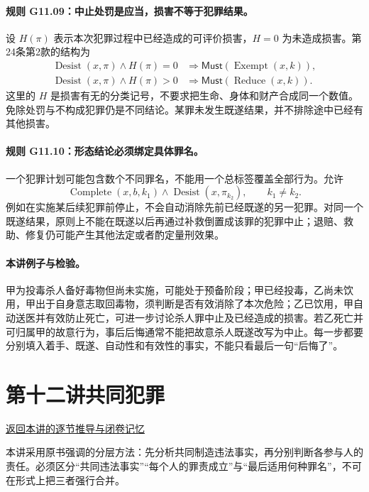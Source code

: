 \paragraph{规则 G11.09：中止处罚是应当，损害不等于犯罪结果。}
设 $H(\pi)$ 表示本次犯罪过程中已经造成的可评价损害，$H=0$ 为未造成损害。第24条第2款的结构为
\[
\begin{aligned}
\operatorname{Desist}(x,\pi)\land H(\pi)=0
&\Longrightarrow\mathsf{Must}(\operatorname{Exempt}(x,k)),\\
\operatorname{Desist}(x,\pi)\land H(\pi)>0
&\Longrightarrow\mathsf{Must}(\operatorname{Reduce}(x,k)).
\end{aligned}
\]
这里的 $H$ 是损害有无的分类记号，不要求把生命、身体和财产合成同一个数值。免除处罚与不构成犯罪仍是不同结论。某罪未发生既遂结果，并不排除途中已经有其他损害。

\paragraph{规则 G11.10：形态结论必须绑定具体罪名。}
一个犯罪计划可能包含数个不同罪名，不能用一个总标签覆盖全部行为。允许
\[
\operatorname{Complete}(x,b,k_1)\land\operatorname{Desist}(x,\pi_{k_2}),
\qquad k_1\ne k_2.
\]
例如在实施某后续犯罪前停止，不会自动消除先前已经既遂的另一犯罪。对同一个既遂结果，原则上不能在既遂以后再通过补救倒置成该罪的犯罪中止；退赔、救助、修复仍可能产生其他法定或者酌定量刑效果。

\paragraph{本讲例子与检验。}
甲为投毒杀人备好毒物但尚未实施，可能处于预备阶段；甲已经投毒，乙尚未饮用，甲出于自身意志取回毒物，须判断是否有效消除了本次危险；乙已饮用，甲自动送医并有效防止死亡，可进一步讨论杀人罪中止及已经造成的损害。若乙死亡并可归属甲的故意行为，事后后悔通常不能把故意杀人既遂改写为中止。每一步都要分别填入着手、既遂、自动性和有效性的事实，不能只看最后一句“后悔了”。

\section{第十二讲\quad 共同犯罪}

\label{ref:lecture:12}

\noindent\hyperref[lecture:12]{返回本讲的逐节推导与闭卷记忆}

本讲采用原书强调的分层方法：先分析共同制造违法事实，再分别判断各参与人的责任。必须区分“共同违法事实”“每个人的罪责成立”与“最后适用何种罪名”，不可在形式上把三者强行合并。

